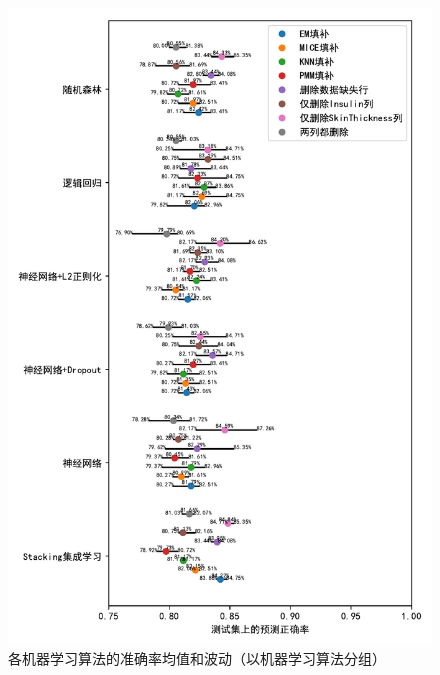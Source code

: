 \documentclass[a4paper]{ctexart}
\begin{document}
\begin{figure}[htbp]
	\centering
	\includegraphics[width=\textwidth]{figure/f2.pdf}
	\caption{各机器学习算法的准确率均值和波动（以机器学习算法分组）}
	\label{figure:网络总体正确率}
\end{figure}
\end{document}
